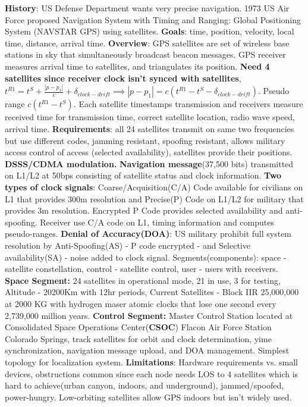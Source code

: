 \documentclass[9pt]{extarticle}
\begin{document}
\begin{multicols}{2}
\textbf{History}: US Defense Department wants very precise navigation. 1973 US Air Force proposed Navigation System with Timing and Ranging: Global Positioning System (NAVSTAR GPS) using satellites. \textbf{Goals}: time, position, velocity, local time, distance, arrival time. \textbf{Overview}: GPS satellites are set of wireless base stations in sky that simultaneously broadcast beacon messages.  GPS receiver measures arrival time to satellites, and triangulates its position. \textbf{Need 4 satellites since receiver clock isn't synced with satellites}, $t^{R1}=t^S+\frac{|p-p_1|}{c}+\delta_{clock-drift}\implies{|p-p_1|=c(t^{R1}-t^S-\delta_{clock-drift})}$. Pseudo range $c(t^{R1}-t^S)$. Each satellite timestamps transmission and receivers measure received time for transmission time, correct satellite location, radio wave speed, arrival time. \textbf{Requirements}: all 24 satellites transmit on same two frequencies but use different codes, jamming resistant, spoofing resistant, allows military access control of access (selected availability), satellites provide their positions. \textbf{DSSS/CDMA modulation.} \textbf{Navigation message}(37,500 bits) transmitted on L1/L2 at 50bps consisting of satellite status and clock information. \textbf{Two types of clock signals}: Coarse/Acquisition(C/A) Code available for civilians on L1 that provides 300m resolution and Precise(P) Code on L1/L2 for military that provides 3m resolution. Encrypted P Code provides selected availability and anti-spoofing. Receiver use C/A code on L1, timing information and computes pseudo-ranges. \textbf{Denial of Accuracy(DOA)}: US military prohibit full system resolution by Anti-Spoofing(AS) - P code encrypted - and Selective availability(SA) - noise added to clock signal. Segments(components): space - satellite constellation, control - satellite control, user - users with receivers. \textbf{Space Segment:} 24 satellites in operational mode, 21 in use, 3 for testing, Altitude - 20200Km with 12hr periods, Current Satellites - Block IIR 25,000,000 at 2000 KG with hydrogen maser atomic clocks that lose one second every 2,739,000 million years. \textbf{Control Segment:} Master Control Station located at Consolidated Space Operations Center(\textbf{CSOC}) Flacon Air Force Station Colorado Springs, track satellites for orbit and clock determination, yime synchronization, navigation message upload, and DOA management. Simplest topology for localization system. \textbf{Limitations}: Hardware requirements vs. small devices, obstructions common since each node needs LOS to 4 satellites which is hard to achieve(urban canyon, indoors, and underground), jammed/spoofed, power-hungry. Low-orbiting satellites allow GPS indoors but isn't widely used.


\end{multicols}
\end{document}
